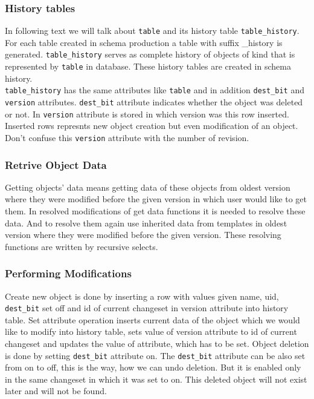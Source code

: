 \documentclass[deska]{subfiles}
\begin{document}
\subsubsection{History tables}
In following text we will talk about {\tt table} and its history table {\tt table\_history}.\\
For each table created in schema production a table with suffix \_history is generated. {\tt table\_history} serves as complete history of objects of kind that is represented by {\tt table} in database. These history tables are created in schema history.\\
{\tt table\_history} has the same attributes like {\tt table} and in addition {\tt dest\_bit} and {\tt version} attributes. {\tt dest\_bit} attribute indicates whether the object was deleted or not. In {\tt version} attribute is stored in which version was this row inserted. Inserted rows represnts new object creation but even modification of an object. Don't confuse this {\tt version} attribute with the number of revision.

\subsubsection{Retrive Object Data}
Getting objects' data means getting data of these objects from oldest version where they were modified before the given version in which user would like to get them.
In resolved modifications of get data functions it is needed to resolve these data. And to resolve them again use inherited data from templates in oldest version where they were modified before the given version.
These resolving functions are written by recursive selects.

\subsubsection{Performing Modifications}
Create new object is done by inserting a row with values given name, uid, {\tt dest\_bit} set off and id of current changeset in version attribute into history table.
Set attribute operation inserts current data of the object which we would like to modify into history table, sets value of version attribute to id of current changeset and updates the value of attribute, which has to be set.
Object deletion is done by setting {\tt dest\_bit} attribute on.
The {\tt dest\_bit} attribute can be also set from on to off, this is the way, how we can undo deletion. But it is enabled only in the same changeset in which it was set to on. This deleted object will not exist later and will not be found.
\end{document}
